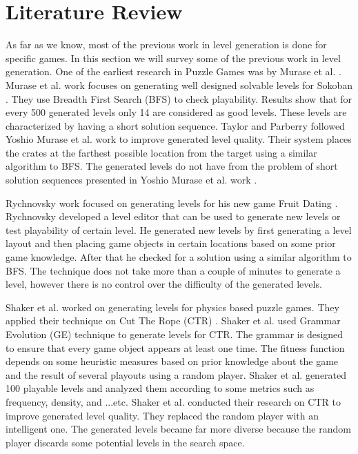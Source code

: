 \documentclass[letterpaper]{article}
\begin{document}
\section{Literature Review}
As far as we know, most of the previous work in level generation is done for specific games. In this section we will survey some of the previous work in level generation. One of the earliest research in Puzzle Games was by Murase et al. \cite{sokobanLevelGenerationOld}. Murase et al. work focuses on generating well designed solvable levels for Sokoban \citeauthor{sokoban}. They use Breadth First Search (BFS) to check playability. Results show that for every 500 generated levels only 14 are considered as good levels. These levels are characterized by having a short solution sequence. Taylor and Parberry \cite{sokobanLevelGenerationNew} followed Yoshio Murase et al. work \cite{sokobanLevelGenerationOld} to improve generated level quality. Their system places the crates at the farthest possible location from the target using a similar algorithm to BFS. The generated levels do not have from the problem of short solution sequences presented in Yoshio Murase et al. work \cite{sokobanLevelGenerationOld}.\\\par

Rychnovsky work \citeauthor{fruitDatingPCG} focused on generating levels for his new game Fruit Dating \citeauthor{fruitDating}. Rychnovsky developed a level editor that can be used to generate new levels or test playability of certain level. He generated new levels by first generating a level layout and then placing game objects in certain locations based on some prior game knowledge. After that he checked for a solution using a similar algorithm to BFS. The technique does not take more than a couple of minutes to generate a level, however there is no control over the difficulty of the generated levels.\\\par

Shaker et al. \cite{ctrAutomaticGeneration} worked on generating levels for physics based puzzle games. They applied their technique on Cut The Rope (CTR) \citeauthor{cutTheRope}. Shaker et al. used Grammar Evolution (GE) technique to generate levels for CTR. The grammar is designed to ensure that every game object appears at least one time. The fitness function depends on some heuristic measures based on prior knowledge about the game and the result of several playouts using a random player. Shaker et al. generated 100 playable levels and analyzed them according to some metrics such as frequency, density, and ...etc. Shaker et al. \cite{ctrSimulationApproach} conducted their research on CTR to improve generated level quality. They replaced the random player with an intelligent one. The generated levels became far more diverse because the random player discards some potential levels in the search space.\\\par
\end{document}
